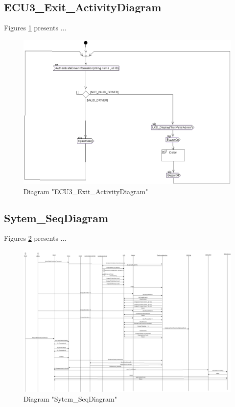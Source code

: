\subsection{ECU3\_Exit\_ActivityDiagram}
Figures \ref{fig:ECU3ExitActivityDiagramECU3ExitActivityDiagram03} presents ...
\begin{figure}[htb]
\centering
\includegraphics[width=\textwidth]{img_0_3.png}
\caption{Diagram "ECU3\_Exit\_ActivityDiagram"}
\label{fig:ECU3ExitActivityDiagramECU3ExitActivityDiagram03}
\end{figure}

\subsection{Sytem\_SeqDiagram}
Figures \ref{fig:SytemSeqDiagramSytemSeqDiagram04} presents ...
\begin{figure}[htb]
\centering
\includegraphics[width=\textwidth]{img_0_4.png}
\caption{Diagram "Sytem\_SeqDiagram"}
\label{fig:SytemSeqDiagramSytemSeqDiagram04}
\end{figure}

